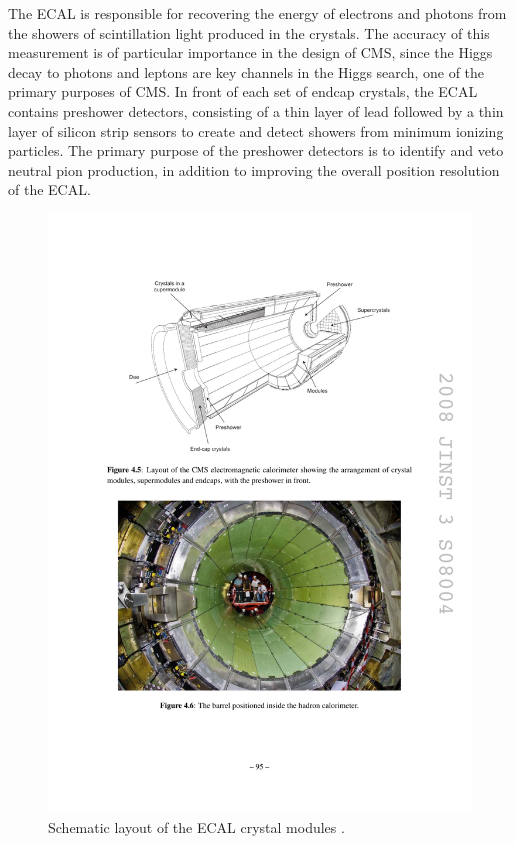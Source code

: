 \indent The ECAL is responsible for recovering the energy of electrons and photons from the showers of scintillation light produced in the crystals. The accuracy of this measurement is of particular importance in the design of CMS, since the Higgs decay to photons and leptons are key channels in the Higgs search, one of the primary purposes of CMS. In front of each set of endcap crystals, the ECAL contains preshower detectors, consisting of a thin layer of lead followed by a thin layer of silicon strip sensors to create and detect showers from minimum ionizing particles. The primary purpose of the preshower detectors is to identify and veto neutral pion production, in addition to improving the overall position resolution of the ECAL.

\begin{figure}[tbh]
\centering
\includegraphics[width=5in]{figures/ecal.pdf}
\caption{Schematic layout of the ECAL crystal modules \cite{1748-0221-3-08-S08004}.}
\label{fig:ecal}
\end{figure}

